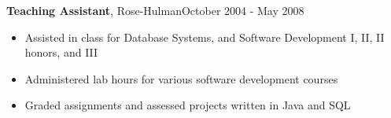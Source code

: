 \documentclass[line, margin, 10pt]{res}
\begin{document}
\begin{resume}
{\bf Teaching Assistant}, Rose-Hulman\hfill October 2004 - May 2008
\begin{itemize} \itemsep -2pt
\item Assisted in class for Database Systems, and Software Development I, II, II honors, and III
\item Administered lab hours for various software development courses
\item Graded assignments and assessed projects written in Java and SQL
\end{itemize}






\end{resume}
\end{document}
